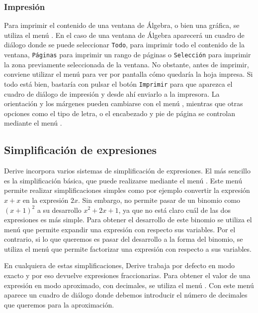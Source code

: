 \subsubsection*{Impresión}
Para imprimir el contenido de una ventana de Álgebra, o bien una
gráfica, se utiliza el menú . En el caso
de una ventana de Álgebra aparecerá un cuadro de diálogo donde se
puede seleccionar \texttt{Todo}, para imprimir todo el contenido de
la ventana, \texttt{Páginas} para imprimir un rango de páginas o
\texttt{Selección} para imprimir la zona previamente seleccionada de
la ventana. No obstante, antes de imprimir, conviene utilizar el
menú  para ver por pantalla cómo
quedaría la hoja impresa. Si todo está bien, bastaría con pulsar el
botón \texttt{Imprimir} para que aparezca el cuadro de diálogo de
impresión y desde ahí enviarlo a la impresora. La orientación y los
márgenes pueden cambiarse con el menú , mientras que otras opciones como el tipo de letra, o el
encabezado y pie de página se controlan mediante el menú
.

\subsection*{Simplificación de expresiones}
Derive incorpora varios sistemas de simplificación de expresiones.
El más sencillo es la simplificación básica, que puede realizarse
mediante el menú . Este menú permite
realizar simplificaciones simples como por ejemplo convertir la
expresión $x+x$ en la expresión $2x$. Sin embargo, no permite pasar
de un binomio como $(x+1)^2$ a su desarrollo $x^2+2x+1$, ya que no
está claro cuál de las dos expresiones es más simple. Para obtener
el desarrollo de este binomio se utiliza el menú
 que permite expandir una expresión
con respecto sus variables. Por el contrario, si lo que queremos es
pasar del desarrollo a la forma del binomio, se utiliza el menú
 que permite factorizar una
expresión con respecto a sus variables.

En cualquiera de estas simplificaciones, Derive trabaja por defecto
en modo exacto y por eso devuelve expresiones fraccionarias. Para
obtener el valor de una expresión en modo aproximado, con decimales,
se utiliza el menú . Con este menú
aparece un cuadro de diálogo donde debemos introducir el número de
decimales que queremos para la aproximación.

